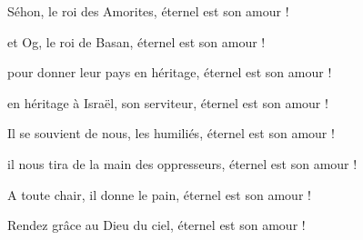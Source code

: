 \item Séhon, le roi des Amorites, éternel est son amour !

\item et Og, le roi de Basan, éternel est son amour !

\item pour donner leur pays en héritage, éternel est son amour !

\item en héritage à Israël, son serviteur, éternel est son amour !

\item Il se souvient de nous, les humiliés, éternel est son amour !

\item il nous tira de la main des oppresseurs, éternel est son amour !

\item A toute chair, il donne le pain, éternel est son amour !

\item Rendez grâce au Dieu du ciel, éternel est son amour !
